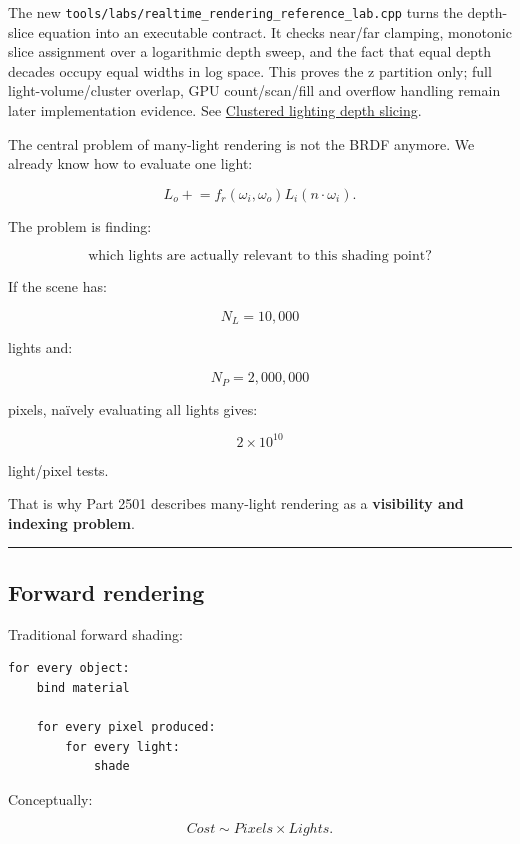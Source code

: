 The new \texttt{tools/labs/realtime\_rendering\_reference\_lab.cpp} turns the depth-slice equation into an executable contract. It checks near/far clamping, monotonic slice assignment over a logarithmic depth sweep, and the fact that equal depth decades occupy equal widths in log space. This proves the z partition only; full light-volume/cluster overlap, GPU count/scan/fill and overflow handling remain later implementation evidence. See \hyperref[appendix-b0efeb3f3648]{Clustered lighting depth slicing}.

The central problem of many-light rendering is not the BRDF anymore. We already know how to evaluate one light:

\[
L_o \mathrel{+}=
f_r(\omega_i,\omega_o)
L_i
(n\cdot\omega_i).
\]

The problem is finding:

\[
\boxed{
\text{which lights are actually relevant to this shading point?}
}
\]

If the scene has:

\[
N_L=10,000
\]

lights and:

\[
N_P=2,000,000
\]

pixels, naïvely evaluating all lights gives:

\[
2\times10^{10}
\]

light/pixel tests.

That is why Part 2501 describes many-light rendering as a \textbf{visibility and indexing problem}.

\begin{center}\rule{0.5\linewidth}{0.5pt}\end{center}

\subsection{Forward rendering}\label{04-visual-computing-ii-ch040-forward-rendering}

\hypertarget{04-visual-computing-ii-ch040-forward-rendering}{}

Traditional forward shading:

\begin{verbatim}
for every object:
    bind material

    for every pixel produced:
        for every light:
            shade
\end{verbatim}

Conceptually:

\[
Cost
\sim
Pixels\times Lights.
\]

